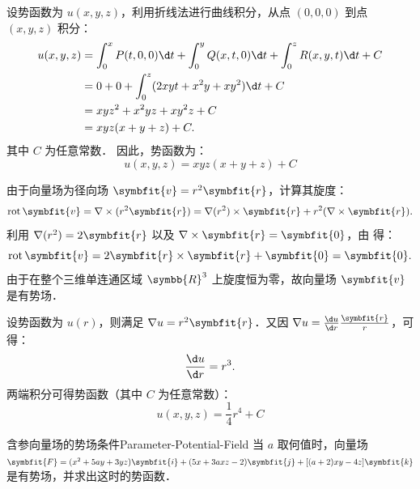 \begin{solution}
    设势函数为 $u(x, y, z)$，利用折线法进行曲线积分，从点 $(0, 0, 0)$ 到点 $(x, y, z)$ 积分：
    \begin{equation}
        \begin{aligned}
            u(x, y, z) & = \int_0^x P(t, 0, 0) \d t + \int_0^y Q(x, t, 0) \d t + \int_0^z R(x, y, t) \d t + C \\
                       & = 0 + 0 + \int_0^z (2xyt + x^2y + xy^2) \d t + C                                     \\
                       & = xyz^2 + x^2yz + xy^2z + C                                                          \\
                       & = xyz(x+y+z) + C.
        \end{aligned}
    \end{equation}
    其中 $C$ 为任意常数．
    因此，势函数为：
    \begin{equation}
        \boxed{u(x, y, z) = xyz(x+y+z) + C}
    \end{equation}


    由于向量场为径向场 $\symbfit{v} = r^2 \symbfit{r}$，计算其旋度：
    \begin{equation}
        \label{eq:curl-identity-3}
        \operatorname{rot} \symbfit{v} = \nabla \times (r^2 \symbfit{r}) = \nabla(r^2) \times \symbfit{r} + r^2 (\nabla \times \symbfit{r}).
    \end{equation}
    利用 $\nabla(r^2) = 2\symbfit{r}$ 以及 $\nabla \times \symbfit{r} = \symbfit{0}$，由  得：
    \begin{equation}
        \operatorname{rot} \symbfit{v} = 2\symbfit{r} \times \symbfit{r} + \symbfit{0} = \symbfit{0}.
    \end{equation}
    由于在整个三维单连通区域 $\symbb{R}^3$ 上旋度恒为零，故向量场 $\symbfit{v}$ 是有势场．

    设势函数为 $u(r)$，则满足 $\nabla u = r^2 \symbfit{r}$．又因 $\nabla u = \frac{\d u}{\d r} \frac{\symbfit{r}}{r}$，可得：
    \begin{equation}
        \frac{\d u}{\d r} = r^3.
    \end{equation}
    两端积分可得势函数（其中 $C$ 为任意常数）：
    \begin{equation}
        \boxed{u(x, y, z) = \frac{1}{4} r^4 + C}
    \end{equation}
\end{solution}

\begin{problem}{含参向量场的势场条件}{Parameter-Potential-Field}
    当 $a$ 取何值时，向量场 $\symbfit{F} = (x^2 + 5ay + 3yz)\symbfit{i} + (5x + 3axz - 2)\symbfit{j} + [(a+2)xy - 4z]\symbfit{k}$ 是有势场，并求出这时的势函数．
\end{problem}

